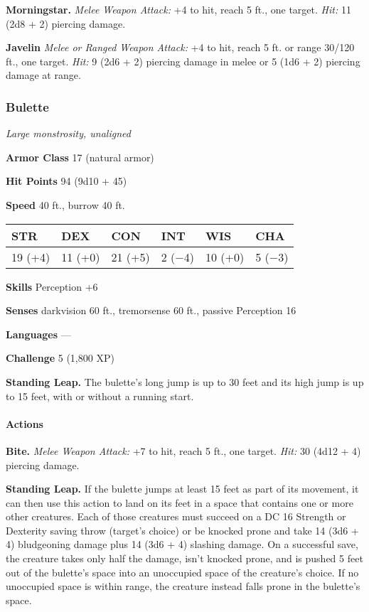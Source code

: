 \documentclass[
]{article}
\begin{document}
\textbf{Morningstar.} \emph{Melee Weapon Attack:} +4 to hit, reach 5
ft., one target. \emph{Hit:} 11 (2d8 + 2) piercing damage.

\textbf{Javelin} \emph{Melee or Ranged Weapon Attack:} +4 to hit, reach
5 ft. or range 30/120 ft., one target. \emph{Hit:} 9 (2d6 + 2) piercing
damage in melee or 5 (1d6 + 2) piercing damage at range.

\hypertarget{bulette}{%
\subsubsection{Bulette}\label{bulette}}

\emph{Large monstrosity, unaligned}

\textbf{Armor Class} 17 (natural armor)

\textbf{Hit Points} 94 (9d10 + 45)

\textbf{Speed} 40 ft., burrow 40 ft.

\begin{longtable}[]{@{}llllll@{}}
\toprule
STR & DEX & CON & INT & WIS & CHA\tabularnewline
\midrule
\endhead
19 (+4) & 11 (+0) & 21 (+5) & 2 (−4) & 10 (+0) & 5 (−3)\tabularnewline
\bottomrule
\end{longtable}

\textbf{Skills} Perception +6

\textbf{Senses} darkvision 60 ft., tremorsense 60 ft., passive
Perception 16

\textbf{Languages} ---

\textbf{Challenge} 5 (1,800 XP)

\textbf{Standing Leap.} The bulette's long jump is up to 30 feet and its
high jump is up to 15 feet, with or without a running start.

\hypertarget{actions-3}{%
\paragraph{Actions}\label{actions-3}}

\textbf{Bite.} \emph{Melee Weapon Attack:} +7 to hit, reach 5 ft., one
target. \emph{Hit:} 30 (4d12 + 4) piercing damage.

\textbf{Standing Leap.} If the bulette jumps at least 15 feet as part of
its movement, it can then use this action to land on its feet in a space
that contains one or more other creatures. Each of those creatures must
succeed on a DC 16 Strength or Dexterity saving throw (target's choice)
or be knocked prone and take 14 (3d6 + 4) bludgeoning damage plus 14
(3d6 + 4) slashing damage. On a successful save, the creature takes only
half the damage, isn't knocked prone, and is pushed 5 feet out of the
bulette's space into an unoccupied space of the creature's choice. If no
unoccupied space is within range, the creature instead falls prone in
the bulette's space.
\end{document}

